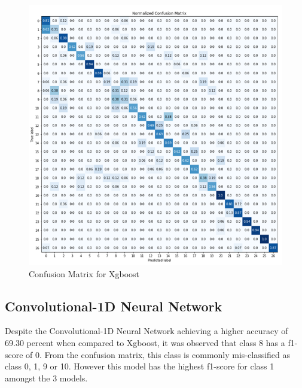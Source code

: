 \documentclass[conference]{IEEEtran}
\begin{document}
\begin{figure}[H]
\begin{center}
\includegraphics[scale=1]{Image/xgb_27_class_confusion.png}
\caption{\label{xgb_27_class_confusion} Confusion Matrix for Xgboost}
\end{center}
\end{figure}

\subsection{Convolutional-1D Neural Network}

Despite the Convolutional-1D Neural Network achieving a higher accuracy of 69.30 percent when compared to Xgboost, it was observed that class 8 has a f1-score of 0. From the confusion matrix, this class is commonly mis-classified as class 0, 1, 9 or 10. However this model has the highest f1-score for class 1 amongst the 3 models.
\end{document}
